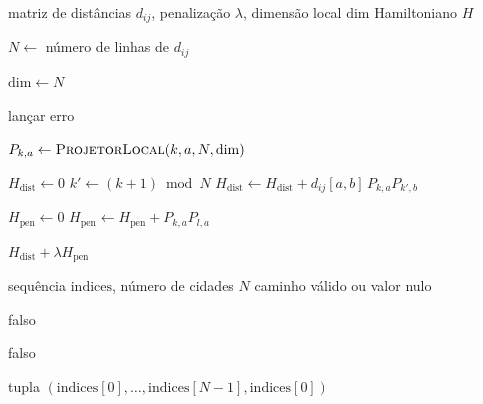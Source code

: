 \begin{algorithm}[!htbp]
\caption{Construção do Hamiltoniano do TSP em qumodes}
\label{alg:hamiltoniano_tsp_qudit}
\begin{algorithmic}[1]
\Require matriz de distâncias $d_{ij}$, penalização $\lambda$, dimensão local $\mathrm{dim}$
\Ensure Hamiltoniano $H$

\State $N \gets$ número de linhas de $d_{ij}$

    \State $\mathrm{dim} \gets N$
\EndIf

    \State lançar erro
\EndIf

        \State $P_{k,a} \gets \Call{ProjetorLocal}{k,a,N,\mathrm{dim}}$
    \EndFor
\EndFor

\State $H_{\mathrm{dist}} \gets 0$
    \State $k' \gets (k+1)\bmod N$
            \State $H_{\mathrm{dist}} \gets H_{\mathrm{dist}} + d_{ij}[a,b]\,P_{k,a}P_{k',b}$
        \EndFor
    \EndFor
\EndFor

\State $H_{\mathrm{pen}} \gets 0$
            \State $H_{\mathrm{pen}} \gets H_{\mathrm{pen}} + P_{k,a}P_{l,a}$
        \EndFor
    \EndFor
\EndFor

\State \Return $H_{\mathrm{dist}} + \lambda H_{\mathrm{pen}}$
\end{algorithmic}
\end{algorithm}

\begin{algorithm}[!htbp]
\caption{Validação e conversão de índices em caminho}
\label{alg:validacao_caminho}
\begin{algorithmic}[1]
\Require sequência $\mathrm{indices}$, número de cidades $N$
\Ensure caminho válido ou valor nulo

    \State \Return falso
\EndIf

    \State \Return falso
\EndIf

\State \Return tupla $(\mathrm{indices}[0], \ldots, \mathrm{indices}[N-1], \mathrm{indices}[0])$
\end{algorithmic}
\end{algorithm}

